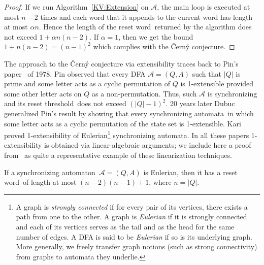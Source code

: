 \documentclass{irmaart}
\newcommand{\sa}{synchronizing au\-tom\-a\-ta}
\newcommand{\san}{synchronizing au\-tom\-a\-ton}
\newcommand{\sw}{reset word}
\newcommand{\rt}{reset threshold}
\theoremstyle{plain}
\begin{document}
\begin{proof}
If we run Algorithm~\ref{KV:Extension} on $\mathcal{A}$, the main loop is
executed at most $n-2$ times and each word that it appends to the current word
has length at most $\alpha n$. Hence the length of the \sw\ returned by the
algorithm does not exceed $1+\alpha n(n-2)$. If $\alpha=1$, then we get the
bound $1+n(n-2)=(n-1)^2$ which complies with the \v{C}ern\'{y} conjecture.
\end{proof}

The approach to the \v{C}ern\'{y} conjecture via extensibility traces back to
Pin's paper~\cite{Pin:1978} of 1978. Pin observed that every DFA
$\mathcal{A}=(Q,A)$ such that $|Q|$ is prime and some letter acts as a cyclic
permutation of $Q$ is 1-extensible provided some other letter acts on $Q$ as a
non-permutation. Thus, such $\mathcal{A}$ is synchronizing and its \rt\ does
not exceed $(|Q|-1)^2$. 20 years later Dubuc~\cite{Dubuc:1998} generalized
Pin's result by showing that every \sa\ in which some letter acts as a cyclic
permutation of the state set is 1-extensible. Kari~\cite{Kari:2003} proved
1-extensibility of Eulerian\footnote{A graph is  \emph{strongly
connected} if for every pair of its vertices,
there exists a path from one to the other. A graph is
\emph{Eulerian} if it is strongly connected and each of
its vertices serves as the tail and as the head for the same number of edges. A
DFA is said to be \emph{Eulerian} if so is its
underlying graph. More generally, we freely transfer graph notions (such as
strong connectivity) from graphs to automata they underlie.} \sa. In all these
papers 1-extensibility is obtained via
linear-algebraic arguments; we include here a proof from~\cite{Kari:2003} as quite a
representative example of these linearization techniques.

\begin{theorem}
\label{KV:thm:eulerian} If a \san\ $\mathcal{A}=(Q,A)$ is Eulerian, then it has
a \sw\ of length at most $(n-2)(n-1)+1$, where $n=|Q|$.
\end{theorem}
\end{document}
